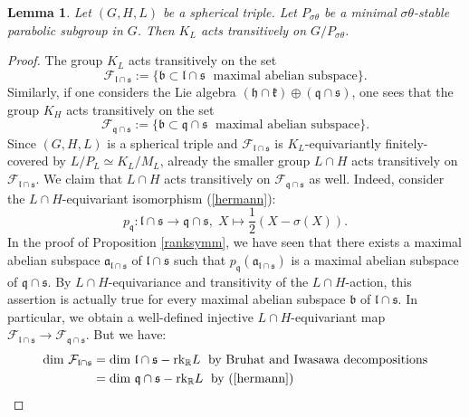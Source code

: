 \documentclass[10]{amsart}
\newtheorem{lem}[thm]{Lemma}
\theoremstyle{remark}
\theoremstyle{definition}
\numberwithin{equation}{section}
\newcommand{\gt}{\theta}
\newcommand{\beu}{\begin{equation*}}
\begin{document}
{\begin{lem}\label{sigmatheta}
Let $(G,H,L)$ be a spherical triple. Let $P_{\sigma\gt}$ be a minimal $\sigma\gt$-stable parabolic subgroup in $G$. 
Then $K_L$ acts transitively on $G/P_{\sigma\gt}$.
\end{lem}
\begin{proof}
The group $K_L$  acts transitively on the set 
%
\beu
{\mathcal F}_{{\mathfrak l}\cap{\mathfrak s}}:=\{{\mathfrak b}\subset{\mathfrak l}\cap{\mathfrak s}\;\text{ maximal abelian subspace}\}.
\end{equation*}
%
Similarly, if one considers the Lie algebra $({\mathfrak h}\cap{\mathfrak k})\oplus({\mathfrak q}\cap{\mathfrak s})$, one sees that the group $K_H$ acts transitively on the set
%
\beu
{\mathcal F}_{{\mathfrak q}\cap{\mathfrak s}}:=\{{\mathfrak b}\subset{\mathfrak q}\cap{\mathfrak s}\;\text{ maximal abelian subspace}\}.
\end{equation*}
%
Since $(G,H,L)$ is a spherical triple and ${\mathcal F}_{{\mathfrak l}\cap{\mathfrak s}}$ is $K_L$-equivariantly finitely-covered by $L/P_L\simeq K_L/M_L$, already the smaller group $L\cap H$ acts transitively on ${\mathcal F}_{{\mathfrak l}\cap{\mathfrak s}}$. We claim that $L\cap H$ acts transitively on ${\mathcal F}_{{\mathfrak q}\cap{\mathfrak s}}$ as well. Indeed, consider the $L\cap H$-equivariant isomorphism (\ref{hermann}): 
%
\beu
p_{{\mathfrak q}}:{\mathfrak l}\cap{\mathfrak s}\rightarrow{\mathfrak q}\cap{\mathfrak s},\;X\mapsto\frac{1}{2}(X-\sigma(X)).
\end{equation*}
%
In the proof of Proposition \ref{ranksymm}, we have seen that there exists a maximal abelian subspace ${\mathfrak a}_{{\mathfrak l}\cap{\mathfrak s}}$ of ${\mathfrak l}\cap{\mathfrak s}$ such that $p_{{\mathfrak q}}({\mathfrak a}_{{\mathfrak l}\cap{\mathfrak s}})$ is a maximal abelian subspace of ${\mathfrak q}\cap{\mathfrak s}$. By $L\cap H$-equivariance and transitivity of the $L\cap H$-action, this assertion is actually true for every maximal abelian subspace ${\mathfrak b}$ of ${\mathfrak l}\cap{\mathfrak s}$. In particular, we obtain a well-defined injective $L\cap H$-equivariant map ${\mathcal F}_{{\mathfrak l}\cap{\mathfrak s}}\rightarrow{\mathcal F}_{{\mathfrak q}\cap{\mathfrak s}}$. But we have:
%
\begin{align*}
\text{dim }{\mathcal F}_{{\mathfrak l}\cap{\mathfrak s}}&=\text{dim }{\mathfrak l}\cap{\mathfrak s}-\text{rk}_{\mathbb R}L\;\text{ by Bruhat and Iwasawa decompositions}\\
&=\text{dim }{\mathfrak q}\cap{\mathfrak s}-\text{rk}_{\mathbb R}L\;\text{ by (\ref{hermann})}\\

\end{align*}
\end{proof}}
\end{document}
